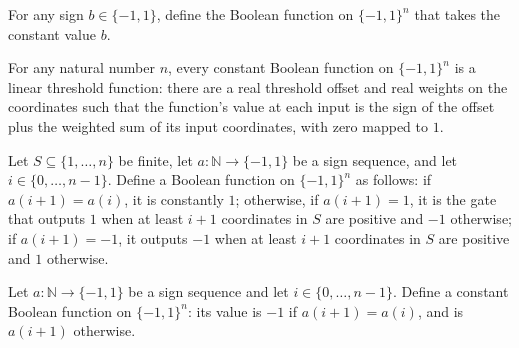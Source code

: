\begin{definition}
\label{FABL.constantThresholdGate}
\leanok
{}
For any sign $b\in\{−1,1\}$, define the Boolean function on $\{−1,1\}^n$ that takes the
constant value $b$.
\end{definition}

\begin{theorem}
\label{FABL.constantThresholdGate_isLinearThreshold}
\leanok
{}
For any natural number $n$, every constant Boolean function on $\{-1,1\}^n$ is a linear
threshold function: there are a real threshold offset and real weights on the
coordinates such that the function's value at each input is the sign of the offset plus
the weighted sum of its input coordinates, with zero mapped to $1$.
\end{theorem}

\begin{definition}
\label{FABL.profileMainGate}
\leanok
{}
Let $S\subseteq\{1,\ldots,n\}$ be finite, let $a\colon\mathbb{N}\to\{−1,1\}$ be a sign
sequence, and let $i\in\{0,\ldots,n-1\}$. Define a Boolean function on $\{−1,1\}^n$ as
follows: if $a(i+1)=a(i)$, it is constantly $1$; otherwise, if $a(i+1)=1$, it is the
gate that outputs $1$ when at least $i+1$ coordinates in $S$ are positive and $−1$
otherwise; if $a(i+1)=−1$, it outputs $−1$ when at least $i+1$ coordinates in $S$ are
positive and $1$ otherwise.
\end{definition}

\begin{definition}
\label{FABL.profileCorrectionGate}
\leanok
{}
Let $a\colon\mathbb{N}\to\{−1,1\}$ be a sign sequence and let $i\in\{0,\ldots,n-1\}$.
Define a constant Boolean function on $\{−1,1\}^n$: its value is $−1$ if $a(i+1)=a(i)$,
and is $a(i+1)$ otherwise.
\end{definition}


